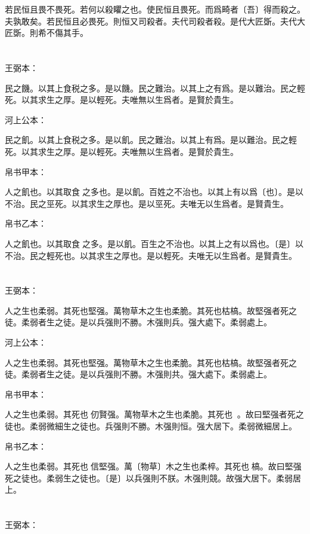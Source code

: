 \documentclass[a5paper]{ctexbook}
\begin{document}
    若民恒且畏不畏死。若何以殺䂂之也。使民恒且畏死。而爲畸者〔吾〕得而殺之。夫孰敢矣。若民恒且必畏死。則恒又司殺者。夫代司殺者殺。是代大匠斲。夫代大匠斲。則希不傷其手。

    \chapter{}
    王弼本：

    民之饑。以其上食税之多。是以饑。民之難治。以其上之有爲。是以難治。民之輕死。以其求生之厚。是以輕死。夫唯無以生爲者。是賢於貴生。

    河上公本：

    民之飢。以其上食税之多。是以飢。民之難治。以其上有爲。是以難治。民之輕死。以其求生之厚。是以輕死。夫唯無以生爲者。是賢於貴生。

    帛书甲本：

    人之飢也。以其取食𨓚之多也。是以飢。百姓之不治也。以其上有以爲〔也〕。是以不治。民之巠死。以其求生之厚也。是以巠死。夫唯无以生爲者。是賢貴生。

    帛书乙本：

    人之飢也。以其取食𨁑之多。是以飢。百生之不治也。以其上之有以爲也。〔是〕以不治。民之輕死也。以其求生之厚也。是以輕死。夫唯无以生爲者。是賢貴生。

    \chapter{}
    王弼本：

    人之生也柔弱。其死也堅强。萬物草木之生也柔脆。其死也枯槁。故堅强者死之徒。柔弱者生之徒。是以兵强則不勝。木强則兵。强大處下。柔弱處上。

    河上公本：

    人之生也柔弱。其死也堅强。萬物草木之生也柔脆。其死也枯槁。故堅强者死之徒。柔弱者生之徒。是以兵强則不勝。木强則共。强大處下。柔弱處上。

    帛书甲本：

    人之生也柔弱。其死也𦵕仞賢强。萬物草木之生也柔脆。其死也𣒞𩫓。故曰堅强者死之徒也。柔弱微細生之徒也。兵强則不勝。木强則恒。强大居下。柔弱微細居上。

    帛书乙本：

    人之生也柔弱。其死也󱁌信堅强。萬〔物草〕木之生也柔椊。其死也𣒞槁。故曰堅强死之徒也。柔弱生之徒也。〔是〕以兵强則不朕。木强則競。故强大居下。柔弱居上。

    \chapter{}
    王弼本：
\end{document}
